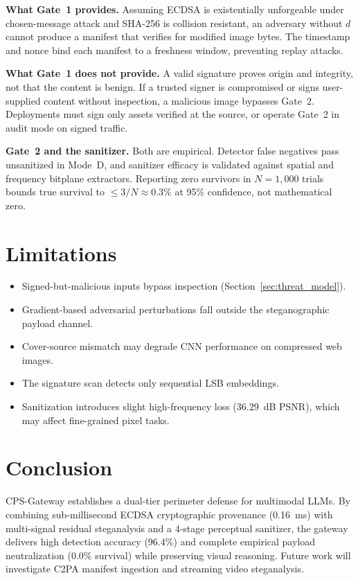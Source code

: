 \documentclass[conference]{IEEEtran}
\begin{document}
\textbf{What Gate~1 provides.} Assuming ECDSA is existentially unforgeable under chosen-message attack and SHA-256 is collision resistant, an adversary without $d$ cannot produce a manifest that verifies for modified image bytes. The timestamp and nonce bind each manifest to a freshness window, preventing replay attacks.

\textbf{What Gate~1 does not provide.} A valid signature proves origin and integrity, not that the content is benign. If a trusted signer is compromised or signs user-supplied content without inspection, a malicious image bypasses Gate~2. Deployments must sign only assets verified at the source, or operate Gate~2 in audit mode on signed traffic.

\textbf{Gate~2 and the sanitizer.} Both are empirical. Detector false negatives pass unsanitized in Mode~D, and sanitizer efficacy is validated against spatial and frequency bitplane extractors. Reporting zero survivors in $N=1{,}000$ trials bounds true survival to $\le 3/N \approx 0.3\%$ at 95\% confidence, not mathematical zero.

\section{Limitations}
\label{sec:limitations}
\begin{itemize}
    \item Signed-but-malicious inputs bypass inspection (Section~\ref{sec:threat_model}).
    \item Gradient-based adversarial perturbations \cite{qi2024visual, carlini2023aligned} fall outside the steganographic payload channel.
    \item Cover-source mismatch may degrade CNN performance on compressed web images.
    \item The signature scan detects only sequential LSB embeddings.
    \item Sanitization introduces slight high-frequency loss (36.29~dB PSNR), which may affect fine-grained pixel tasks.
\end{itemize}

\section{Conclusion}
\label{sec:conclusion}

CPS-Gateway establishes a dual-tier perimeter defense for multimodal LLMs. By combining sub-millisecond ECDSA cryptographic provenance (0.16~ms) with multi-signal residual steganalysis and a 4-stage perceptual sanitizer, the gateway delivers high detection accuracy (96.4\%) and complete empirical payload neutralization (0.0\% survival) while preserving visual reasoning. Future work will investigate C2PA manifest ingestion and streaming video steganalysis.
\end{document}
